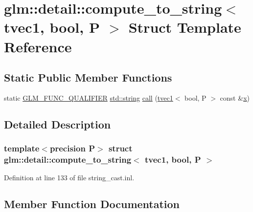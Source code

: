 \hypertarget{structglm_1_1detail_1_1compute__to__string_3_01tvec1_00_01bool_00_01_p_01_4}{}\section{glm\+::detail\+::compute\+\_\+to\+\_\+string$<$ tvec1, bool, P $>$ Struct Template Reference}
\label{structglm_1_1detail_1_1compute__to__string_3_01tvec1_00_01bool_00_01_p_01_4}
\subsection*{Static Public Member Functions}
\begin{DoxyCompactItemize}
\item 
static \mbox{\hyperlink{setup_8hpp_a33fdea6f91c5f834105f7415e2a64407}{G\+L\+M\+\_\+\+F\+U\+N\+C\+\_\+\+Q\+U\+A\+L\+I\+F\+I\+ER}} \mbox{\hyperlink{glad_8h_ac83513893df92266f79a515488701770}{std\+::string}} \mbox{\hyperlink{structglm_1_1detail_1_1compute__to__string_3_01tvec1_00_01bool_00_01_p_01_4_aea165ad1c3cf2cf3339182c54d28ae1a}{call}} (\mbox{\hyperlink{structglm_1_1tvec1}{tvec1}}$<$ bool, P $>$ const \&\mbox{\hyperlink{glad_8h_a92d0386e5c19fb81ea88c9f99644ab1d}{x}})
\end{DoxyCompactItemize}


\subsection{Detailed Description}
\subsubsection*{template$<$precision P$>$\newline
struct glm\+::detail\+::compute\+\_\+to\+\_\+string$<$ tvec1, bool, P $>$}



Definition at line 133 of file string\+\_\+cast.\+inl.



\subsection{Member Function Documentation}
\mbox{\label{structglm_1_1detail_1_1compute__to__string_3_01tvec1_00_01bool_00_01_p_01_4_aea165ad1c3cf2cf3339182c54d28ae1a}} 
